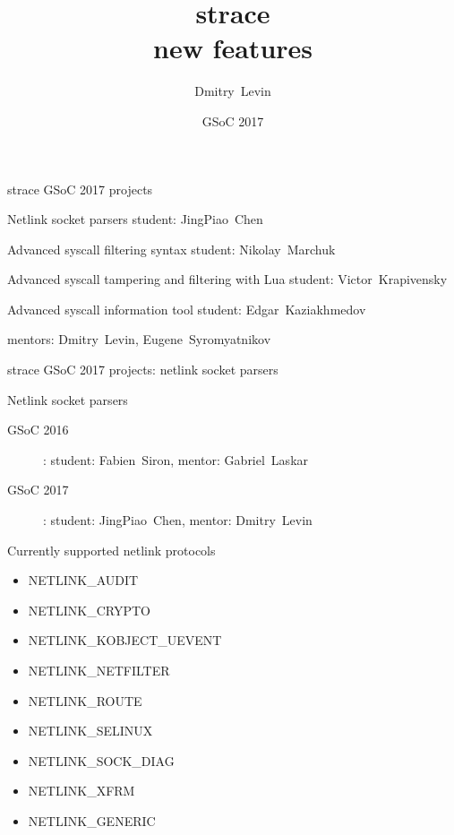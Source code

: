 \documentclass[unicode]{beamer}
\title{\Huge strace \\ new features}
\author{\huge Dmitry~Levin}
\date{\Huge GSoC 2017}
\begin{document}
\begin{frame}
\titlepage
\end{frame}

\begin{frame}{strace GSoC 2017 projects}
\begin{block}{\large Netlink socket parsers}
student: JingPiao~Chen
\end{block}
\begin{block}{\large Advanced syscall filtering syntax}
student: Nikolay~Marchuk
\end{block}
\begin{block}{\large Advanced syscall tampering and filtering with Lua}
student: Victor~Krapivensky
\end{block}
\begin{block}{\large Advanced syscall information tool}
student: Edgar~Kaziakhmedov
\end{block}
mentors: Dmitry~Levin, Eugene~Syromyatnikov
\end{frame}

\begin{frame}{strace GSoC 2017 projects: netlink socket parsers}
\begin{block}{Netlink socket parsers}
\begin{description}
\item[GSoC 2016]: student: Fabien~Siron, mentor: Gabriel~Laskar
\item[GSoC 2017]: student: JingPiao~Chen, mentor: Dmitry~Levin
\end{description}
\end{block}
\begin{block}{Currently supported netlink protocols}
\begin{itemize}
\item NETLINK\_AUDIT
\item NETLINK\_CRYPTO
\item NETLINK\_KOBJECT\_UEVENT
\item NETLINK\_NETFILTER
\item NETLINK\_ROUTE
\item NETLINK\_SELINUX
\item NETLINK\_SOCK\_DIAG
\item NETLINK\_XFRM
\item NETLINK\_GENERIC
\end{itemize}
\end{block}
\end{frame}
\end{document}
